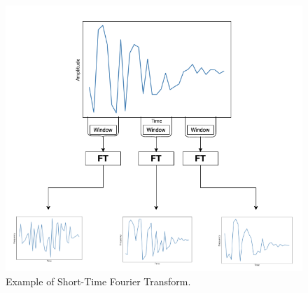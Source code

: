 \documentclass{turabian-thesis}
\begin{document}
\begin{figure}[h]
   \begin{center}
      \includegraphics[scale=0.6]{../media/stft.png}
   \end{center}
   \caption{Example of Short-Time Fourier Transform.}
   \label{fig:stft_example}
\end{figure}

\end{document}
